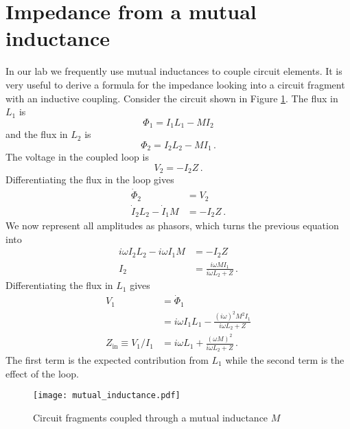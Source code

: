 \section{Impedance from a mutual inductance}

In our lab we frequently use mutual inductances to couple circuit elements.
It is very useful to derive a formula for the impedance looking into a circuit fragment with an inductive coupling.
Consider the circuit shown in Figure \ref{Fig:mutualInductance}.
The flux in $L_1$ is
\begin{equation}
\Phi_1 = I_1 L_1 - M I_2
\end{equation}
and the flux in $L_2$ is
\begin{equation}
\Phi_2 = I_2 L_2 - M I_1 \, .
\end{equation}
The voltage in the coupled loop is
\begin{equation}
V_2 = - I_2 Z \, .
\end{equation}
Differentiating the flux in the loop gives
\begin{align}
\dot{\Phi}_2 &= V_2 \\
\dot{I}_2 L_2 - \dot{I}_1 M &= - I_2 Z \,.
\end{align}
We now represent all amplitudes as phasors, which turns the previous equation into
\begin{align}
i \omega I_2 L_2 - i \omega I_1 M &= - I_2 Z \\
I_2 &= \frac{i \omega M I_1}{i\omega L_2 + Z} \, .
\end{align}
Differentiating the flux in $L_1$ gives
\begin{align}
V_1 &= \dot{\Phi}_1 \\
&= i \omega I_1 L_1 - \frac{(i \omega)^2 M^2 I_1}{i \omega L_2 + Z} \\
Z_{\text{in}} \equiv V_1/I_1 &= i \omega L_1 + \frac{(\omega M)^2}{i \omega L_2 + Z} \, .
\end{align}
The first term is the expected contribution from $L_{1}$ while the second term is the effect of the loop.

\begin{figure}
\begin{centering}
\texttt{[image: mutual\_inductance.pdf]} 
\par\end{centering}
\caption{Circuit fragments coupled through a mutual inductance $M$}
\label{Fig:mutualInductance}
\end{figure}
